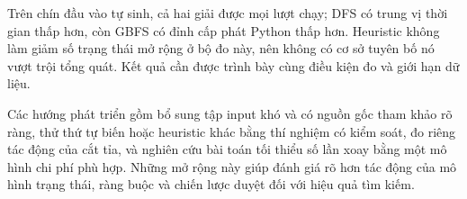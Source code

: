 Trên chín đầu vào tự sinh, cả hai giải được mọi lượt chạy; DFS có trung vị
thời gian thấp hơn, còn GBFS có đỉnh cấp phát Python thấp hơn. Heuristic
không làm giảm số trạng thái mở rộng ở bộ đo này, nên không có cơ sở tuyên
bố nó vượt trội tổng quát. Kết quả cần được trình bày cùng điều kiện đo và
giới hạn dữ liệu.

Các hướng phát triển gồm bổ sung tập input khó và có nguồn gốc tham khảo rõ
ràng, thử thứ tự biến hoặc heuristic khác bằng thí nghiệm có kiểm soát, đo
riêng tác động của cắt tỉa, và nghiên cứu bài toán tối thiểu số lần xoay bằng
một mô hình chi phí phù hợp. Những mở rộng này giúp đánh giá rõ hơn tác động
của mô hình trạng thái, ràng buộc và chiến lược duyệt đối với hiệu quả tìm kiếm.
